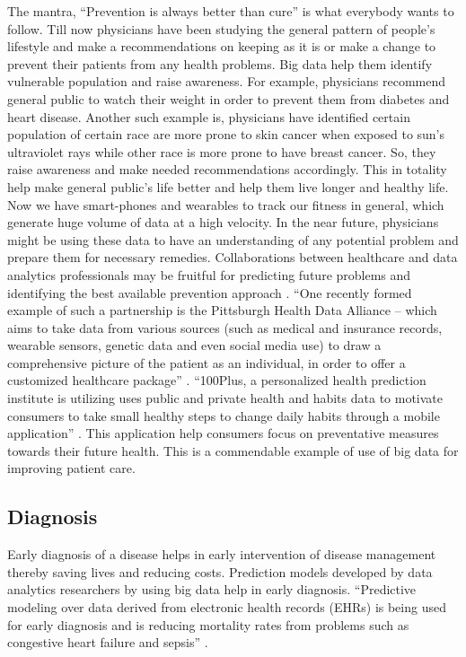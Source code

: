 \documentclass[sigconf]{acmart}
\begin{document}
The mantra, ``Prevention is always better than cure'' is what everybody
wants to follow. Till now physicians have been studying the general pattern of people's lifestyle and make a recommendations on 
keeping as it is or make a change to prevent their patients from any health problems. Big data help them identify vulnerable 
population and raise awareness. For example, physicians recommend general public to watch their weight in order to prevent them 
from diabetes and heart disease. Another such example is, physicians have identified certain population of certain race are more
prone to skin cancer when exposed to sun's ultraviolet rays while other race is more prone to have breast cancer. So, they 
raise awareness and make needed recommendations accordingly. This in totality help make general public's life better and help them live
longer and healthy life. Now we have smart-phones and wearables to track our fitness in general, which generate huge volume of data 
at a high velocity. In the near future, physicians might be using these data to have an understanding of any potential problem 
and prepare them for necessary remedies. Collaborations between healthcare and data analytics professionals may be fruitful for predicting future problems and identifying the best available prevention approach \cite{www-forbes-com}. 
``One recently formed example of such a partnership is the Pittsburgh Health Data Alliance -- which aims to take data from various sources (such as medical and insurance records, 
wearable sensors, genetic data and even social media use) to draw a comprehensive picture of the patient as an individual, in order 
to offer a customized healthcare package'' \cite{www-forbes-com}. ``100Plus, a personalized health prediction institute is utilizing uses public and private health and habits  data to motivate consumers to take 
small healthy steps to change daily habits through a mobile application'' \cite{www-ghdonline-org}. This application help consumers focus on preventative measures towards their future health. This is a commendable example of use of big data for improving patient care.  

 

\subsection{Diagnosis}
Early diagnosis of a disease helps in early intervention of disease management thereby saving lives and reducing costs. 
Prediction models developed by data analytics researchers by using big data help in early diagnosis. ``Predictive modeling over data 
derived from electronic health records (EHRs) is being used for early diagnosis and is reducing mortality rates from problems such as congestive heart failure and sepsis'' \cite{www-mapr-com}.  
\end{document}
